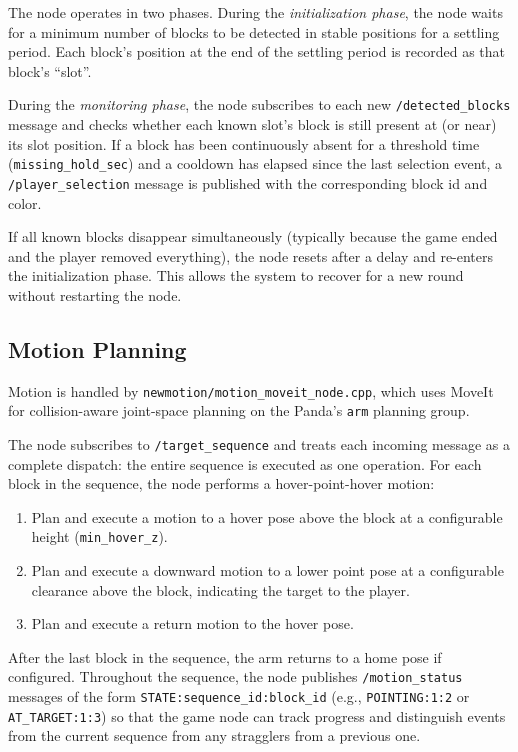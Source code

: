 \documentclass[conference]{IEEEtran}
\begin{document}
The node operates in two phases. During the \textit{initialization
phase}, the node waits for a minimum number of blocks to be detected
in stable positions for a settling period. Each block's position at
the end of the settling period is recorded as that block's ``slot''.

During the \textit{monitoring phase}, the node subscribes to each new
\texttt{/detected\_blocks} message and checks whether each known
slot's block is still present at (or near) its slot position. If a
block has been continuously absent for a threshold time
(\texttt{missing\_hold\_sec}) and a cooldown has elapsed since the
last selection event, a \texttt{/player\_selection} message is
published with the corresponding block id and color.

If all known blocks disappear simultaneously (typically because the
game ended and the player removed everything), the node resets after
a delay and re-enters the initialization phase. This allows the system
to recover for a new round without restarting the node.

\subsection{Motion Planning}
\label{sec:motion}

Motion is handled by \texttt{newmotion/motion\_moveit\_node.cpp}, which
uses MoveIt for collision-aware joint-space planning on the Panda's
\texttt{arm} planning group.

The node subscribes to \texttt{/target\_sequence} and treats each
incoming message as a complete dispatch: the entire sequence is
executed as one operation. For each block in the sequence, the node
performs a hover-point-hover motion:

\begin{enumerate}
\item Plan and execute a motion to a hover pose above the block at
a configurable height (\texttt{min\_hover\_z}).
\item Plan and execute a downward motion to a lower point pose at
a configurable clearance above the block, indicating the target to
the player.
\item Plan and execute a return motion to the hover pose.
\end{enumerate}

After the last block in the sequence, the arm returns to a home pose
if configured. Throughout the sequence, the node publishes
\texttt{/motion\_status} messages of the form
\texttt{STATE:sequence\_id:block\_id} (e.g.,
\texttt{POINTING:1:2} or \texttt{AT\_TARGET:1:3}) so that the game
node can track progress and distinguish events from the current
sequence from any stragglers from a previous one.
\end{document}

